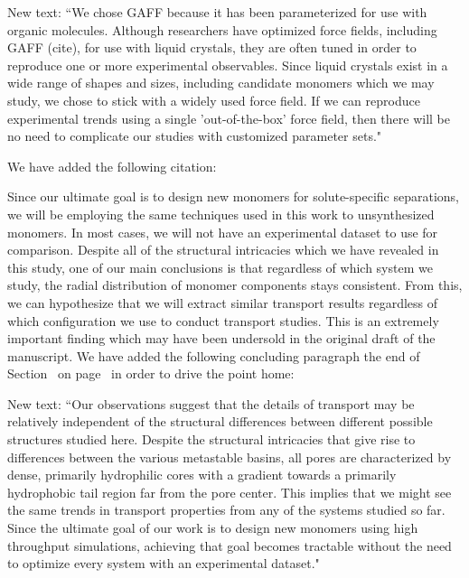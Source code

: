 \documentclass{article}
\begin{document}
\begin{enumerate}
    New text: ``We chose GAFF because it has been parameterized for use with
    organic molecules. Although researchers have optimized force fields, including
    GAFF (cite), for use with liquid crystals, they are often tuned in order to
    reproduce one or more experimental observables. Since liquid crystals exist in
    a wide range of shapes and sizes, including candidate monomers which we may
    study, we chose to stick with a widely used force field. If we
    can reproduce experimental trends using a single 'out-of-the-box' force field,
    then there will be no need to complicate our studies with customized parameter
    sets."

    We have added the following citation:

    Since our ultimate goal is to design new monomers for solute-specific
    separations, we will be employing the same techniques used in this work to
    unsynthesized monomers. In most cases, we will not have an experimental dataset
    to use for comparison. Despite all of the structural intricacies which we have
    revealed in this study, one of our main conclusions is that regardless of which
    system we study, the radial distribution of monomer components stays
    consistent. From this, we can hypothesize that we will extract similar
    transport results regardless of which configuration we use to conduct
    transport studies. This is an extremely important finding which may have
    been undersold in the original draft of the manuscript. We have added the
    following concluding paragraph the end of
    Section~\label{section:pore_composition} on
    page~\pageref{addition:pore_composition} in order to drive the point home:

    New text: ``Our observations suggest that the details of transport may be
    relatively independent of the structural differences between different possible
    structures studied here. Despite the structural intricacies that give rise to
    differences between the various metastable basins, all pores are characterized
    by dense, primarily hydrophilic cores with a gradient towards a primarily
    hydrophobic tail region far from the pore center. This implies that we might
    see the same trends in transport properties from any of the systems studied so
    far. Since the ultimate goal of our work is to design new monomers using high
    throughput simulations, achieving that goal becomes tractable without the need
    to optimize every system with an experimental dataset."
	

\end{enumerate}
\end{document}
